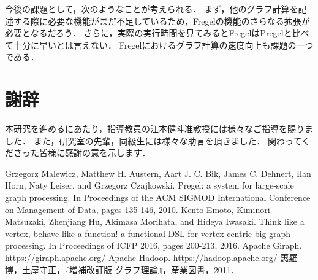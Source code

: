 \documentclass[12pt]{ujreport}
\begin{document}
今後の課題として，次のようなことが考えられる．
まず，他のグラフ計算を記述する際に必要な機能がまだ不足しているため，Fregelの機能のさらなる拡張が必要となるだろう．
さらに，実際の実行時間を見てみるとFregelはPregelと比べて十分に早いとは言えない．
Fregelにおけるグラフ計算の速度向上も課題の一つである．

\newpage

\chapter*{謝辞}

本研究を進めるにあたり，指導教員の江本健斗准教授には様々なご指導を賜りました．
また，研究室の先輩，同級生には様々な助言を頂きました．
関わってくださった皆様に感謝の意を示します．

\newpage

\begin{thebibliography}{9}
  Grzegorz Malewicz, Matthew H. Austern, Aart J. C. Bik, James C. Dehnert, Ilan Horn, Naty Leiser, and Grzegorz Czajkowski.
  Pregel: a system for large-scale graph processing.
  In Proceedings of the ACM SIGMOD International Conference on Management of Data, pages 135-146, 2010.
  Kento Emoto, Kiminori Matsuzaki, Zhenjiang Hu, Akimasa Morihata, and Hideya Iwasaki.
  Think like a vertex, behave like a function! a functional DSL for vertex-centric big graph processing.
  In Proceedings of ICFP 2016, pages 200-213, 2016.
  Apache Giraph. https://giraph.apache.org/
  Apache Hadoop. https://hadoop.apache.org/
  惠羅博，土屋守正，『増補改訂版 グラフ理論』，産業図書，2011．
\end{thebibliography}
\end{document}
